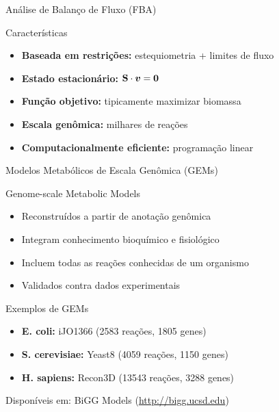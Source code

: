 \begin{frame}{Análise de Balanço de Fluxo (FBA)}

\vspace{0.3cm}

\begin{block}{Características}
\begin{itemize}
    \item \textbf{Baseada em restrições:} estequiometria + limites de fluxo
    \item \textbf{Estado estacionário:} $\mathbf{S} \cdot \boldsymbol{v} = \boldsymbol{0}$
    \item \textbf{Função objetivo:} tipicamente maximizar biomassa
    \item \textbf{Escala genômica:} milhares de reações
    \item \textbf{Computacionalmente eficiente:} programação linear
\end{itemize}
\end{block}

\end{frame}

\begin{frame}{Modelos Metabólicos de Escala Genômica (GEMs)}
\begin{block}{Genome-scale Metabolic Models}
\begin{itemize}
    \item Reconstruídos a partir de anotação genômica
    \item Integram conhecimento bioquímico e fisiológico
    \item Incluem todas as reações conhecidas de um organismo
    \item Validados contra dados experimentais
\end{itemize}
\end{block}

\begin{exampleblock}{Exemplos de GEMs}
\begin{itemize}
    \item \textbf{E. coli:} iJO1366 (2583 reações, 1805 genes)
    \item \textbf{S. cerevisiae:} Yeast8 (4059 reações, 1150 genes)
    \item \textbf{H. sapiens:} Recon3D (13543 reações, 3288 genes)
\end{itemize}
\end{exampleblock}

\vspace{0.2cm}

\begin{center}
\small
Disponíveis em: BiGG Models (\url{http://bigg.ucsd.edu})
\end{center}
\end{frame}

